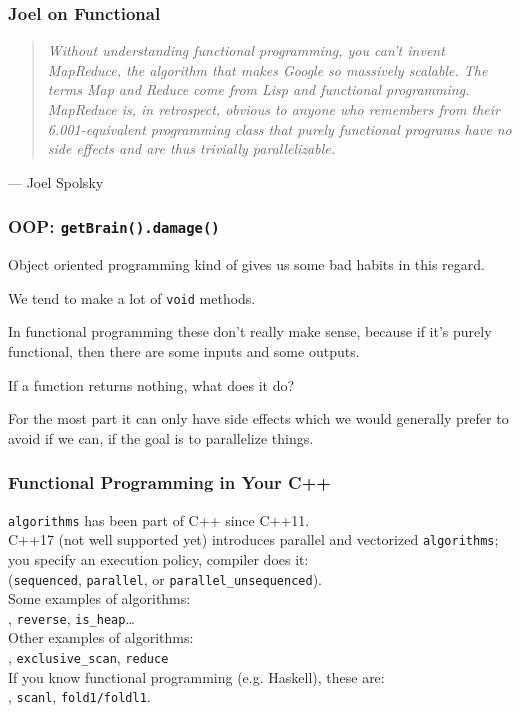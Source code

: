 \begin{frame}
\frametitle{Joel on Functional}

\begin{quote}
\textit{Without understanding functional programming, you can't invent MapReduce, the algorithm that makes Google so massively scalable. The terms Map and Reduce come from Lisp and functional programming. MapReduce is, in retrospect, obvious to anyone who remembers from their 6.001-equivalent programming class that purely functional programs have no side effects and are thus trivially parallelizable.}
\end{quote}
\hfill --- Joel Spolsky


\end{frame}

\begin{frame}
\frametitle{OOP: \texttt{getBrain().damage()}}

Object oriented programming kind of gives us some bad habits in this regard. 

We tend to make a lot of \texttt{void} methods. 

In functional programming these don't really make sense, because if it's purely functional, then there are some inputs and some outputs. 

If a function returns nothing, what does it do? 

For the most part it can only have side effects which we would generally prefer to avoid if we can, if the goal is to parallelize things. 

\end{frame}

\begin{frame}
\frametitle{Functional Programming in Your C++}

{\tt algorithms} has been part of C++ since C++11.\\

C++17 (not well supported yet) introduces parallel and vectorized {\tt algorithms};\\
\qquad you specify an execution policy, compiler does it:\\
\qquad ({\tt sequenced}, {\tt parallel},
or {\tt parallel\_unsequenced}).\\[1em]

Some examples of algorithms:\\
, {\tt reverse}, {\tt is\_heap}\ldots\\[1em]

Other examples of algorithms:\\
, {\tt exclusive\_scan}, {\tt reduce}\\[1em]
If you know functional programming (e.g. Haskell), these are:\\
, {\tt scanl}, {\tt fold1/foldl1}.

\end{frame}

